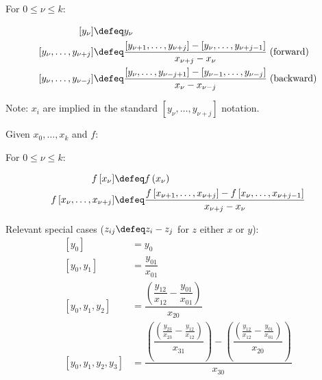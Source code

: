 For $0 \leq \nu \leq k$:

\begin{align}
\left[ y_{\nu} \right] & \defeq y_{\nu}
\\
\left[ y_{\nu}, \ldots , y_{\nu + j} \right] & \defeq 
\frac{
\left[ y_{\nu + 1}, \ldots ,  y_{\nu + j} \right]
-
\left[ y_{\nu}, \ldots ,  y_{\nu + j - 1} \right]
}{
x_{\nu + j} - x_{\nu}
} 
\; \text{(forward)}
\nonumber
\\
\left[ y_{\nu}, \ldots , y_{\nu - j} \right] & \defeq 
\frac{
\left[ y_{\nu}, \ldots ,  y_{\nu - j + 1} \right]
-
\left[ y_{\nu - 1}, \ldots ,  y_{\nu - j} \right]
}{
x_{\nu} - x_{\nu - j}
} 
\; \text{(backward)}
\nonumber
\end{align}

Note: $x_i$ are implied in the standard 
$\left[ y_{\nu}, \ldots , y_{\nu + j} \right]$ notation.

Given $x_0, \ldots , x_k$ and $f$:

For $0 \leq \nu \leq k$:

\begin{align}
f \left[ x_{\nu} \right] & \defeq f \left( x_{\nu} \right)
\\
f \left[ x_{\nu}, \ldots , x_{\nu + j} \right] & \defeq 
\frac{
f \left[ x_{\nu + 1}, \ldots ,  x_{\nu + j} \right]
-
f \left[ x_{\nu}, \ldots ,  x_{\nu + j - 1} \right]
}{
x_{\nu + j} - x_{\nu}
} 
\nonumber
\end{align}

Relevant special cases ($z_{ij} \defeq z_i - z_j$ for $z$ 
either $x$ or $y$): 
\begin{align}
\left[ y_0 \right] & = y_0 
\\
\left[ y_0 , y_1  \right] & = 
\dfrac{y_{01}}{x_{01}} 
\nonumber
\\
\left[ y_0 , y_1 , y_2 \right] & = 
\dfrac{
\left( \dfrac{y_{12}}{x_{12}} - \dfrac{y_{01}}{x_{01}} \right)
}{
x_{20}
} 
\nonumber
\\
\left[ y_0 , y_1 , y_2 , y_3 \right] & = 
\dfrac{
 \left(
 \dfrac{
 \left(
  \frac{y_{23}}{x_{23}} - \frac{y_{12}}{x_{12}}
  \right)
  }{x_{31}}
  \right)
 -
 \left(
 \dfrac{
 \left(
  \frac{y_{12}}{x_{12}} - \frac{y_{01}}{x_{01}}
  \right)
  }{x_{20}}
  \right)
}{
x_{30}
} 
\nonumber
\end{align}
